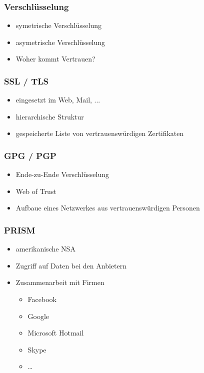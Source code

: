 \documentclass[12pt]{beamer}
\begin{document}
\begin{frame}
    \frametitle{Verschlüsselung}
    \begin{itemize}
      \item<2-> symetrische Verschlüsselung
      \item<3-> asymetrische Verschlüsselung
      \item<4-> Woher kommt Vertrauen?
    \end{itemize}
\end{frame}

\begin{frame}
    \frametitle{SSL / TLS}
    \begin{itemize}
      \item<2-> eingesetzt im Web, Mail, ...
      \item<3-> hierarchische Struktur
      \item<4-> gespeicherte Liste von vertrauenswürdigen Zertifikaten
    \end{itemize}
\end{frame}

\begin{frame}
    \frametitle{GPG / PGP}
    \begin{itemize}
      \item<2-> Ende-zu-Ende Verschlüsselung
      \item<3-> Web of Trust
      \item<4-> Aufbaue eines Netzwerkes aus vertrauenswürdigen Personen
    \end{itemize}
\end{frame}

\begin{frame}
    \frametitle{PRISM}
    \begin{itemize}
      \item<2-> amerikanische NSA
      \item<3-> Zugriff auf Daten bei den Anbietern
      \item<4-> Zusammenarbeit mit Firmen
        \begin{itemize}
          \item<5-> Facebook
          \item<6-> Google
          \item<7-> Microsoft Hotmail
          \item<8-> Skype
          \item<9-> \ldots
        \end{itemize}
    \end{itemize}
\end{frame}
\end{document}
